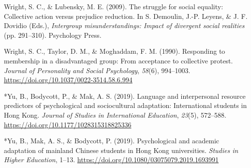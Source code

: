 \documentclass[12pt, letterpaper]{article}
\begin{document}
\leavevmode\hypertarget{ref-wright_struggle_2009}{}%
Wright, S. C., \& Lubensky, M. E. (2009). The struggle for social
equality: Collective action versus prejudice reduction. In S. Demoulin,
J.-P. Leyens, \& J. F. Dovidio (Eds.), \emph{Intergroup
misunderstandings: Impact of divergent social realities} (pp. 291--310).
Psychology Press.

\leavevmode\hypertarget{ref-wright_responding_1990}{}%
Wright, S. C., Taylor, D. M., \& Moghaddam, F. M. (1990). Responding to
membership in a disadvantaged group: From acceptance to collective
protest. \emph{Journal of Personality and Social Psychology},
\emph{58}(6), 994--1003.
\url{https://doi.org/10.1037/0022-3514.58.6.994}

\leavevmode\hypertarget{ref-1395}{}%
*Yu, B., Bodycott, P., \& Mak, A. S. (2019). Language and interpersonal
resource predictors of psychological and sociocultural adaptation:
International students in Hong Kong. \emph{Journal of Studies in
International Education}, \emph{23}(5), 572--588.
\url{https://doi.org/10.1177/1028315318825336}

\leavevmode\hypertarget{ref-3000}{}%
*Yu, B., Mak, A. S., \& Bodycott, P. (2019). Psychological and academic
adaptation of mainland Chinese students in Hong Kong universities.
\emph{Studies in Higher Education}, 1--13.
\url{https://doi.org/10.1080/03075079.2019.1693991}

\endgroup
\end{document}
